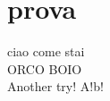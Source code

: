 \documentclass{article}
\begin{document}
    \section{prova}
        ciao come stai\\
        ORCO BOIO\\
        Another try! A!b!
\end{document}
